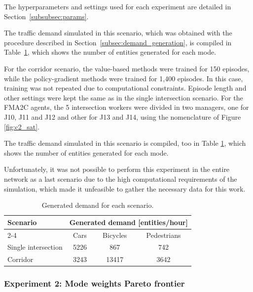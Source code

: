 The hyperparameters and settings used for each experiment are detailed in Section~\ref{subsubsec:params}.

The traffic demand simulated in this scenario, which was obtained with the procedure described in Section~\ref{subsec:demand_generation}, is compiled in Table~\ref{tab:gene_demands}, which shows the number of entities generated for each mode.

\medskip

\noindent For the corridor scenario, the value-based methods were trained for 150 episodes, while the policy-gradient methods were trained for 1,400 episodes. In this case, training was not repeated due to computational constraints. Episode length and other settings were kept the same as in the single intersection scenario. For the FMA2C agents, the 5 intersection workers were divided in two managers, one for J10, J11 and J12 and other for J13 and J14, using the nomenclature of Figure \ref{fig:c2_sat}.

The traffic demand simulated in this scenario is compiled, too in Table \ref{tab:gene_demands}, which shows the number of entities generated for each mode.

\medskip

\noindent Unfortunately, it was not possible to perform this experiment in the entire network as a last scenario due to the high computational requirements of the simulation, which made it unfeasible to gather the necessary data for this work. 

\begin{table}[]
\centering
\caption{Generated demand for each scenario.}
\label{tab:gene_demands}
\begin{tabular}{@{}lccc@{}}
\toprule
\multirow{2}{*}{\textbf{Scenario}} & \multicolumn{3}{c}{\textbf{Generated demand [entities/hour]}} \\ \cmidrule(l){2-4} 
 & Cars & Bicycles & Pedestrians \\ \midrule
Single intersection & 5226 & 867 & 742 \\
Corridor & 3243 & 13417 & 3642 \\ \bottomrule
\end{tabular}
\end{table}

\subsubsection{Experiment 2: Mode weights Pareto frontier} \label{subsubsec:exp_2}


